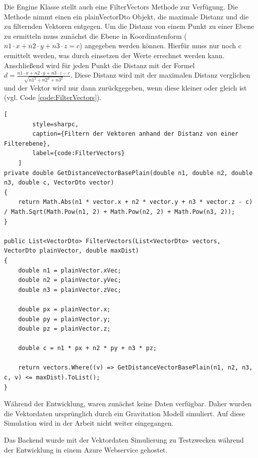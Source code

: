Die Engine Klasse stellt auch eine FilterVectors Methode zur Verfügung.
Die Methode nimmt einen ein plainVectorDto Objekt, die maximale Distanz
und die zu filternden Vektoren entgegen. Um die Distanz von einem Punkt
zu einer Ebene zu ermitteln muss zunächst die Ebene in Koordinatenform
($n1 \cdot x + n2 \cdot y + n3 \cdot z = c$) angegeben werden können.
Hierfür muss nur noch c ermittelt werden, was durch einsetzen der Werte
errechnet werden kann. Anschließend wird für jeden Punkt die Distanz
mit der Formel $d = \frac{n1 \cdot x + n2 \cdot y + n3 \cdot z - c}{\sqrt{n1^2 + n2^2 + n3^2}}$.
Diese Distanz wird mit der maximalen Distanz verglichen und der Vektor
wird nur dann zurückgegeben, wenn diese kleiner oder gleich ist
(vgl. Code \ref{code:FilterVectors}).

\begin{codeblock}
	\begin{lstlisting}[
		style=sharpc,
		caption={Filtern der Vektoren anhand der Distanz von einer Filterebene},
		label={code:FilterVectors}
	]
private double GetDistanceVectorBasePlain(double n1, double n2, double n3, double c, VectorDto vector)
{
	return Math.Abs(n1 * vector.x + n2 * vector.y + n3 * vector.z - c) / Math.Sqrt(Math.Pow(n1, 2) + Math.Pow(n2, 2) + Math.Pow(n3, 2));
}

public List<VectorDto> FilterVectors(List<VectorDto> vectors, VectorDto plainVector, double maxDist)
{
	double n1 = plainVector.xVec;
	double n2 = plainVector.yVec;
	double n3 = plainVector.zVec;

	double px = plainVector.x;
	double py = plainVector.y;
	double pz = plainVector.z;

	double c = n1 * px + n2 * py + n3 * pz;

	return vectors.Where((v) => GetDistanceVectorBasePlain(n1, n2, n3, c, v) <= maxDist).ToList();
}
	\end{lstlisting}
\end{codeblock}

Während der Entwicklung, waren zunächst keine Daten verfügbar.
Daher wurden die Vektordaten ursprünglich durch ein Gravitation Modell
simuliert. Auf diese Simulation wird in der Arbeit nicht weiter
eingegangen.

Das Backend wurde mit der Vektordaten Simulierung zu Testzwecken während
der Entwicklung in einem Azure Webservice gehostet.

